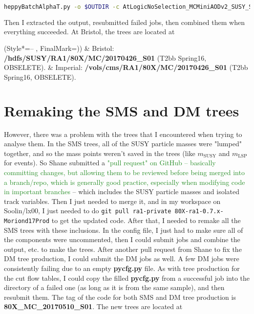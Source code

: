 \begin{lstlisting}[belowskip=-0.7cm, language=sh, numbers=none]
heppyBatchAlphaT.py -o $OUTDIR -c AtLogicNoSelection_MCMiniAODv2_SUSY_SMS_FastSim
\end{lstlisting}

Then I extracted the output, resubmitted failed jobs, then combined them when everything succeeded. At Bristol, the trees are located at

\begin{easylist}
\ListProperties(Style*=-- , FinalMark={)})
& Bristol: \textbf{/hdfs/SUSY/RA1/80X/MC/20170426\_S01} (T2bb Spring16, OBSELETE).
& Imperial: \textbf{/vols/cms/RA1/80X/MC/20170426\_S01} (T2bb Spring16, OBSELETE).
\end{easylist}


\section{Remaking the SMS and DM trees}

However, there was a problem with the trees that I encountered when trying to analyse them. In the SMS trees, all of the SUSY particle masses were "lumped" together, and so the mass points weren't saved in the trees (like $m_{\mathrm{SUSY}}$ and $m_{\mathrm{LSP}}$ for events). So Shane submitted a \textcolor{ForestGreen}{"pull request" on GitHub -- basically committing changes, but allowing them to be reviewed before being merged into a branch/repo, which is generally good practice, especially when modifying code in important branches} -- which includes the SUSY particle masses and isolated track variables. Then I just needed to merge it, and in my workspace on Soolin/lx00, I just needed to do \texttt{git pull ra1-private 80X-ra1-0.7.x-Moriond17Prod} to get the updated code. After that, I needed to remake all the SMS trees with these inclusions. In the config file, I just had to make sure all of the components were uncommented, then I could submit jobs and combine the output, etc. to make the trees. After another pull request from Shane to fix the DM tree production, I could submit the DM jobs as well. A few DM jobs were consistently failing due to an empty \textbf{pycfg.py} file. As with tree production for the cut flow tables, I could copy the filled \textbf{pycfg.py} from a successful job into the directory of a failed one (as long as it is from the same sample), and then resubmit them. The tag of the code for both SMS and DM tree production is \textbf{80X\_MC\_20170510\_S01}. The new trees are located at

